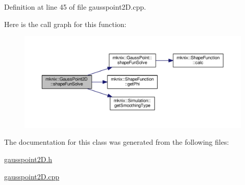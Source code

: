 Definition at line 45 of file gausspoint2\+D.\+cpp.



Here is the call graph for this function\+:\nopagebreak
\begin{figure}[H]
\begin{center}
\leavevmode
\includegraphics[width=350pt]{df/d77/classmknix_1_1_gauss_point2_d_abca54057afb35ce0c15a717464939441_cgraph}
\end{center}
\end{figure}




The documentation for this class was generated from the following files\+:\begin{DoxyCompactItemize}
\item 
\hyperlink{gausspoint2_d_8h}{gausspoint2\+D.\+h}\item 
\hyperlink{gausspoint2_d_8cpp}{gausspoint2\+D.\+cpp}\end{DoxyCompactItemize}
